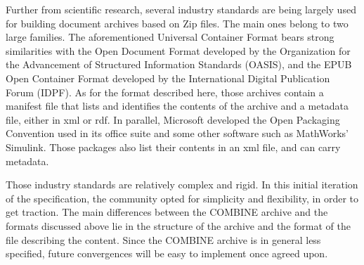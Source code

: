 Further from scientific research, several industry standards are being largely 
used for building document archives based on Zip files. The main ones belong to 
two large families. The aforementioned Universal Container Format bears strong 
similarities with the Open Document Format \citep{ODF} developed by the Organization 
for the Advancement of Structured Information Standards (OASIS), and the EPUB 
Open Container Format  \citep{OCF} developed by the International Digital Publication 
Forum (IDPF). As for the format described here, those archives contain a manifest 
file that lists and identifies the contents of the archive and a metadata file, 
either in xml or rdf. In parallel, Microsoft developed the Open Packaging Convention  \citep{OPC} 
used in its office suite and some other software such as MathWorks' Simulink. Those 
packages also list their contents in an xml file, and can carry metadata. 


Those industry standards are relatively complex and rigid. In this initial iteration 
of the specification, the community opted for simplicity and flexibility, in order 
to get traction. The main differences between the COMBINE archive and the formats 
discussed above lie in the structure of the archive and the format of the file 
describing the content. Since the COMBINE archive is in general less specified, 
future convergences will be easy to implement once agreed upon.
